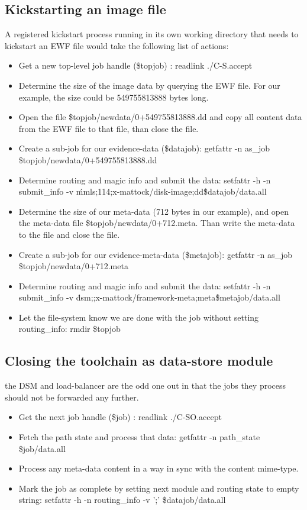 \subsection{Kickstarting an image file}
A registered kickstart process running in its own working directory that needs to kickstart an EWF file would take the following list of actions:
\begin{itemize}
\item Get a new top-level job handle (\$topjob) : readlink \@./C-S.accept
\item Determine the size of the image data by querying the EWF file. For our example, the size could be 549755813888 bytes long.
\item Open the file \$topjob/newdata/0+549755813888.dd and copy all content data from the EWF file to that file, than close the file.
\item Create a sub-job for our evidence-data (\$datajob): getfattr -n as\_job \$topjob/newdata/0+549755813888.dd
\item Determine routing and magic info and submit the data: setfattr -h -n submit\_info -v \'mmls;114;x-mattock/disk-image;dd\' \$datajob/data.all
\item Determine the size of our meta-data (712 bytes in our example), and open the meta-data file \$topjob/newdata/0+712.meta. Than write the meta-data to the file and close the file.
\item Create a sub-job for our evidence-meta-data (\$metajob): getfattr -n as\_job \$topjob/newdata/0+712.meta
\item Determine routing and magic info and submit the data: setfattr -h -n submit\_info -v \'dsm;;x-mattock/framework-meta;meta\' \$metajob/data.all
\item Let the file-system know we are done with the job without setting routing\_info: rmdir \$topjob
\end{itemize}
\subsection{Closing the toolchain as data-store module}
the DSM and load-balancer are the odd one out in that the jobs they process should not be forwarded any further.
\begin{itemize}
\item Get the next job handle (\$job) : readlink \@./C-SO.accept
\item Fetch the path state and process that data: getfattr -n path\_state \$job/data.all
\item Process any meta-data content in a way in sync with the content mime-type.
\item Mark the job as complete by setting next module and routing state to empty string:  setfattr -h -n routing\_info -v ';' \$datajob/data.all
\end{itemize}

